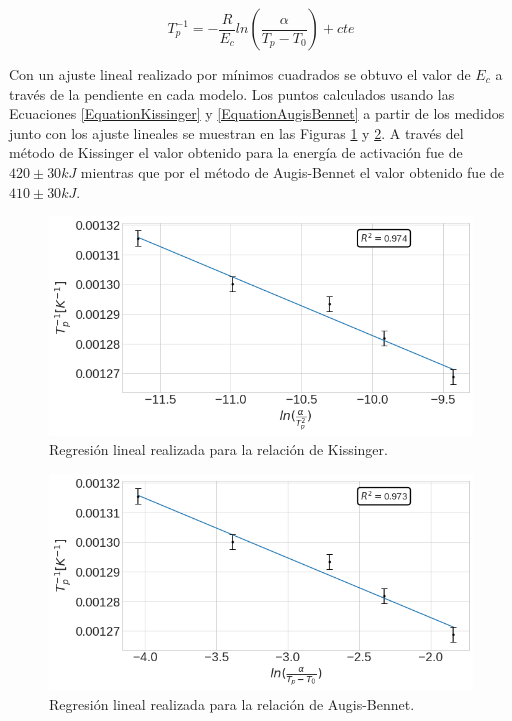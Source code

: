 \documentclass[12pt]{article}
\theoremstyle{definition}
\theoremstyle{remark}
\begin{document}
{\begin{equation}
\label{EquationAugisBennet}
	T_p^{-1}=-\frac{R}{E_c}ln(\frac{\alpha}{T_p-T_0})+cte
\end{equation}

Con un ajuste lineal realizado por mínimos cuadrados se obtuvo el valor de $E_c$ a través de la pendiente en cada modelo. Los puntos calculados usando las Ecuaciones \ref{EquationKissinger} y \ref{EquationAugisBennet} a partir de los medidos junto con los ajuste lineales se muestran en las Figuras \ref{Kiss} y \ref{AugBen}. A través del método de Kissinger el valor obtenido para la energía de activación fue de $420 \pm 30 kJ$ mientras que por el método de Augis-Bennet el valor obtenido fue de $410 \pm 30 kJ$.

\begin{figure}[H]
 	\centering
	\includegraphics[scale=0.4]{img/Kissinger.png}
 	\caption{Regresión lineal realizada para la relación de Kissinger.}
	\label{Kiss}
\end{figure} 

 \begin{figure}[H]
 	\centering
	\includegraphics[scale=0.4]{img/Augis_bennet.png}
 	\caption{Regresión lineal realizada para la relación de Augis-Bennet.}
	\label{AugBen}
\end{figure} 

}
\end{document}
